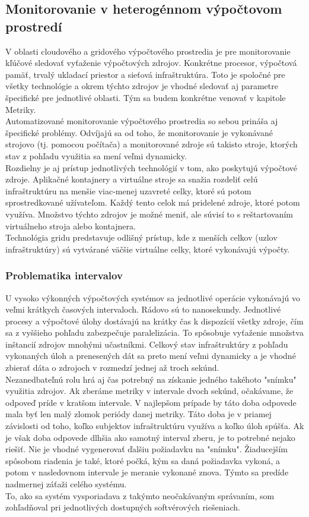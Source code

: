 \documentclass[12pt,twoside,color,cover,table]{fithesis3}
\begin{document}
\subsection{Monitorovanie v heterogénnom výpočtovom prostredí}
V oblasti cloudového a gridového výpočtového prostredia je pre monitorovanie kľúčové sledovať vyťaženie výpočtových zdrojov. Konkrétne procesor, výpočtová pamäť, trvalý ukladací priestor a sieťová infraštruktúra. Toto je spoločné
pre všetky technológie a okrem týchto zdrojov je vhodné sledovať aj parametre špecifické pre jednotlivé oblasti. Tým sa budem konkrétne venovať v kapitole Metriky.
\\Automatizované monitorovanie výpočtového prostredia so sebou prináša aj špecifické problémy. Odvíjajú sa od toho, že monitorovanie je vykonávané strojovo (tj. pomocou počítača) a monitorované zdroje sú takisto stroje, ktorých
stav z pohľadu využitia sa mení veľmi dynamicky.
\\Rozdielny je aj prístup jednotlivých technológií v tom, ako poskytujú výpočtové zdroje. Aplikačné kontajnery a virtuálne stroje sa snažia rozdeliť celú infraštruktúru na menšie viac-menej uzavreté celky, 
ktoré sú potom sprostredkované užívateľom. Každý tento celok má pridelené zdroje, ktoré potom využíva. Množstvo týchto zdrojov je možné meniť, ale súvisí to s reštartovaním virtuálneho stroja alebo kontajnera.
\\Technológia gridu predstavuje odlišný prístup, kde z menších celkov (uzlov infraštruktúry) sú vytvárané väčšie virtuálne celky, ktoré vykonávajú výpočty.

\subsubsection{Problematika intervalov}
U vysoko výkonných výpočtových systémov sa jednotlivé operácie vykonávajú vo veľmi krátkych časových intervaloch. Rádovo sú to nanosekundy. Jednotlivé procesy a výpočtové úlohy dostávajú na krátky čas k dispozícií všetky zdroje, čím 
sa z vyššieho pohľadu zabezpečuje paralelizácia. To spôsobuje vyťaženie množstva inštancií zdrojov mnohými učastníkmi. Celkový stav infraštruktúry z pohľadu vykonaných úloh a prenesených dát sa preto mení veľmi dynamicky a je vhodné
zbierať dáta o zdrojoch v rozmedzí jednej až troch sekúnd. 
\\Nezanedbateľnú rolu hrá aj čas potrebný na získanie jedného takéhoto "snímku" využitia zdrojov. Ak zberáme metriky v intervale dvoch sekúnd, očakávame, že odpoveď príde v kratšom intervale. 
V najlepšom prípade by táto doba odpovede mala byť len malý zlomok periódy danej metriky. Táto doba je v priamej závislosti od toho, koľko subjektov infraštruktúru využíva a koľko úloh spúšťa. 
Ak je však doba odpovede dlhšia ako samotný interval zberu, je to potrebné nejako riešiť. Nie je vhodné vygenerovať ďalšiu požiadavku na "snímku". Žiaducejším spôsobom riadenia je také, ktoré počká, kým sa daná požiadavka vykoná, a potom v nasledovnom intervale je meranie vykonané znova. Týmto sa predíde nadmernej záťaži
celého systému.
\\To, ako sa systém vysporiadava z takýmto neočakávaným správaním, som zohľadňoval pri jednotlivých dostupných softvérových riešeniach.
\end{document}
